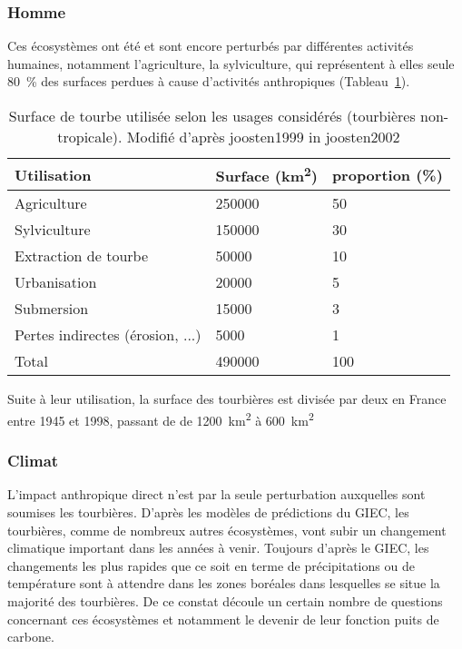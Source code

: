 \subsubsection{Homme}
Ces écosystèmes ont été et sont encore perturbés par différentes activités humaines, notamment l'agriculture, la sylviculture, qui représentent à elles seule \SI{80}{\percent} des surfaces perdues à cause d'activités anthropiques (Tableau~\ref{table:tourbeUsage}). 
\begin{table}[!h]
\centering
\caption{Surface de tourbe utilisée selon les usages considérés (tourbières non-tropicale). Modifié d'après joosten1999 in joosten2002}
\label{table:tourbeUsage}
\begin{tabular}{lll}\toprule
Utilisation & Surface (\si{\square\kilo\meter})  & proportion (\%) \\ \midrule
Agriculture & \num{250000} & \num{50} \\ 
Sylviculture & \num{150000} & \num{30}\\ 
Extraction de tourbe & \num{50000} & \num{10}\\ 
Urbanisation & \num{20000} & \num{5}\\ 
Submersion & \num{15000} & \num{3}\\ 
Pertes indirectes (érosion, ...) & \num{5000} & \num{1}\\[1ex]
Total & \num{490000} & \num{100}\\
\bottomrule
\end{tabular}
\end{table}

Suite à leur utilisation, la surface des tourbières est divisée par deux en France entre 1945 et 1998, passant de de \SI{1200}{\square\kilo\meter} à \SI{600}{\square\kilo\meter} \cite{manneville1999}

\subsubsection{Climat}
L'impact anthropique direct n'est par la seule perturbation auxquelles sont soumises les tourbières.
D'après les modèles de prédictions du GIEC, les tourbières, comme de nombreux autres écosystèmes, vont subir un changement climatique important dans les années à venir.
Toujours d'après le GIEC, les changements les plus rapides que ce soit en terme de précipitations ou de température sont à attendre dans les zones boréales dans lesquelles se situe la majorité des tourbières.
De ce constat découle un certain nombre de questions concernant ces écosystèmes et notamment le devenir de leur fonction puits de carbone.

